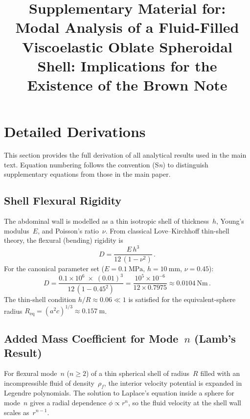 \documentclass[12pt]{article}
\title{Supplementary Material for:\\[6pt]
  \textbf{Modal Analysis of a Fluid-Filled Viscoelastic Oblate Spheroidal Shell:
  Implications for the Existence of the Brown Note}}
\author{}
\date{}
\begin{document}
\maketitle

\tableofcontents
\newpage

\section{Detailed Derivations}
\label{sec:derivations}

This section provides the full derivation of all analytical results used in the
main text.  Equation numbering follows the convention (S\textit{n}) to
distinguish supplementary equations from those in the main paper.

\subsection{Shell Flexural Rigidity}
\label{sec:flexural_rigidity}

The abdominal wall is modelled as a thin isotropic shell of thickness~$h$,
Young's modulus~$E$, and Poisson's ratio~$\nu$.  From classical
Love--Kirchhoff thin-shell theory, the flexural (bending) rigidity is
\begin{equation}
  D = \frac{E\,h^{3}}{12\,(1-\nu^{2})} \,.
  \label{eq:D}
  \tag{S1}
\end{equation}
For the canonical parameter set ($E = \SI{0.1}{\mega\pascal}$,
$h = \SI{10}{\milli\metre}$, $\nu = 0.45$):
\[
  D = \frac{0.1\times10^{6}\;\times\;(0.01)^{3}}{12\,(1 - 0.45^{2})}
    = \frac{10^{5}\times10^{-6}}{12\times0.7975}
    \approx \SI{0.0104}{\newton\metre} \,.
\]
The thin-shell condition $h/R \approx 0.06 \ll 1$ is satisfied for the
equivalent-sphere radius $R_{\mathrm{eq}} = (a^{2}c)^{1/3} \approx \SI{0.157}{\metre}$.

\subsection{Added Mass Coefficient for Mode~\texorpdfstring{$n$}{n} (Lamb's Result)}
\label{sec:added_mass}

For flexural mode~$n$ ($n \geq 2$) of a thin spherical shell of radius~$R$
filled with an incompressible fluid of density~$\rho_{f}$, the interior
velocity potential is expanded in Legendre polynomials.  The solution to
Laplace's equation inside a sphere for mode~$n$ gives a radial dependence
$\phi \propto r^{n}$, so the fluid velocity at the shell wall scales
as~$r^{n-1}$.
\end{document}
